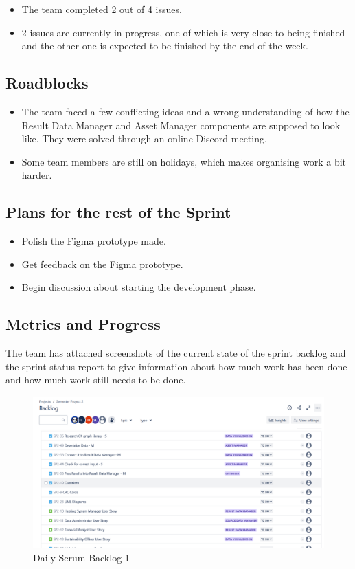 \documentclass[12pt]{report}
\begin{document}
\begin{itemize}
    \item The team completed 2 out of 4 issues.
    \item 2 issues are currently in progress, one of which is very close to being finished and the other one is expected to be finished by the end of the week.
\end{itemize}

\subsection*{Roadblocks}
\begin{itemize}
    \item The team faced a few conflicting ideas and a wrong understanding of how the Result Data Manager and Asset Manager components are supposed to look like. They were solved through an online Discord meeting.
    \item Some team members are still on holidays, which makes organising work a bit harder.
\end{itemize}

\subsection*{Plans for the rest of the Sprint}
\begin{itemize}
    \item Polish the Figma prototype made.
    \item Get feedback on the Figma prototype.
    \item Begin discussion about starting the development phase.
\end{itemize}

\subsection*{Metrics and Progress}
The team has attached screenshots of the current state of the sprint backlog and the sprint status report to give information about how much work has been done and how much work still needs to be done.

\begin{figure}[H]
  \centering
  \includegraphics[width=1\textwidth]{Resources/2-Sprint/Daily-Scrum/backlog1.png}
  \caption{Daily Scrum Backlog 1}
  \label{fig:S2Scrum1-image}
\end{figure}
\end{document}
